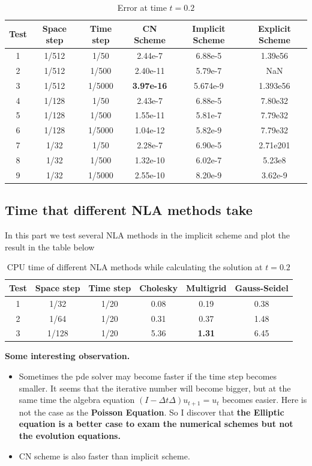 \documentclass[12pt]{amsart}
\begin{document}
\begin{table}[!hbp]
	\begin{tabular}{|c|c|c|c|c|c|}
		\hline
		\hline
		Test & Space step & Time step & CN Scheme & Implicit Scheme&Explicit Scheme \\
		\hline
		1 & 1/512 & 1/50 & 2.44e-7&6.88e-5 &1.39e56\\
		\hline
		2& 1/512 & 1/500  & 2.40e-11 & 5.79e-7& NaN \\
		\hline
		3&1/512 & 1/5000 & \textbf{3.97e-16} & 5.674e-9 &1.393e56\\
		\hline
		\hline
		4&1/128&1/50&2.43e-7&6.88e-5&7.80e32 \\
		\hline
		5&1/128&1/500&1.55e-11&5.81e-7&7.79e32\\
		\hline
		6&1/128&1/5000&1.04e-12&5.82e-9&7.79e32\\
		\hline
		\hline
		7& 1/32 &  1/50   & 2.28e-7&6.90e-5 &2.71e201\\
		\hline
		8& 1/32 &1/500   & 1.32e-10 &6.02e-7 &5.23e8\\
		\hline
		9& 1/32 & 1/5000   & 2.55e-10 &8.20e-9 &3.62e-9\\
		\hline
	\end{tabular}
	\caption{Error at time $t=0.2$}
\end{table} 

\subsection{Time that different NLA methods take} In this part we test several NLA methods in the implicit scheme and plot the result in the table below


\begin{table}[!hbp]
	\begin{tabular}{|c|c|c|c|c|c|}
		\hline
		\hline
		Test & Space step & Time step & Cholesky & Multigrid &Gauss-Seidel \\
		\hline
		1 & 1/32 & 1/20 &0.08 &0.19&0.38\\
		\hline
		2 & 1/64 & 1/20 &0.31 &0.37&1.48\\
		\hline
		3 & 1/128 & 1/20 & 5.36&\textbf{1.31}&6.45\\
		\hline
	\end{tabular}
	\caption{CPU time of different NLA methods while calculating the solution at $t=0.2$}
\end{table} 
\textbf{Some interesting observation.}

\begin{itemize}
	\item Sometimes the pde solver may become faster if the time step becomes smaller. It seems that the iterative number will become bigger, but at the same time the algebra equation $(I-\Delta t\Delta)u_{t+1}=u_{t}$ becomes easier.  Here is not the case as the \textbf{Poisson Equation}. So I discover that \textbf{the Elliptic equation is a better case to exam the numerical schemes but not the evolution equations.}
	\item CN scheme is also faster than implicit scheme.
\end{itemize}
\end{document}
